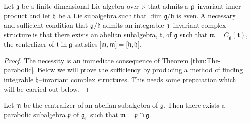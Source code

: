 \documentclass{amse-new}
\numberwithin{equation}{section} %
\begin{document}
\begin{theorem}
\label{Wang} Let $\mathfrak{g}$ be a finite dimensional Lie algebra over
$\mathbb{R}$ that admits a $\mathfrak{g}$--invariant inner product and let
$\mathfrak{h}$ be a Lie subalgebra such that $\dim\mathfrak{g}/\mathfrak{h}$
is even. A necessary and sufficient condition that $\mathfrak{g}/\mathfrak{h}
$ admits an integrable $\mathfrak{h}$--invariant complex structure is that
there exists an abelian subalgebra, $\mathfrak{t}$, of $\mathfrak{g}$ such
that  $\mathfrak{m}=C_\mathfrak{g}(\mathfrak{t})$, the centralizer of $\mathfrak{t}$ in $\mathfrak{g}$
satisfies  $[\mathfrak{m}, \mathfrak{m]=}%
[\mathfrak{h}, \mathfrak{h]}$.
\end{theorem}

\begin{proof}
The necessity is an immediate consequence of Theorem \ref{thm:The-parabolic}.
Below we will prove the sufficiency by producing a method of finding
integrable $\mathfrak{h}$--invariant complex structures. This needs some preparation which will be carried out below.
\end{proof}



\begin{lemma}
\label{lmm:21} Let $\mathfrak{m}$ be the centralizer of an abelian subalgebra
of $\mathfrak{g}$. Then there exists a parabolic subalgebra $\mathfrak{p}$ of $\mathfrak{g}%
_{\mathbb{C}}$ such that $\mathfrak{m}=\mathfrak{p}\cap\mathfrak{g}$.
\end{lemma}
\end{document}
